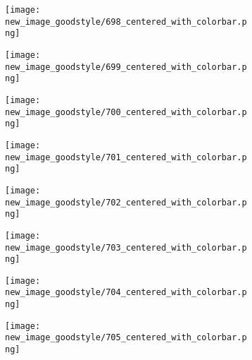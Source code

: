 \documentclass[a4paper,12pt]{article}
\begin{document}
\begin{figure}[H]
  \begin{subfigure}{0.11\textwidth}
    \texttt{[image: new\_image\_goodstyle/698\_centered\_with\_colorbar.png]}
  \end{subfigure}
  \hfill
  \begin{subfigure}{0.11\textwidth}
    \texttt{[image: new\_image\_goodstyle/699\_centered\_with\_colorbar.png]}
  \end{subfigure}
  \hfill
  \begin{subfigure}{0.11\textwidth}
    \texttt{[image: new\_image\_goodstyle/700\_centered\_with\_colorbar.png]}
  \end{subfigure}
  \hfill
  \begin{subfigure}{0.11\textwidth}
    \texttt{[image: new\_image\_goodstyle/701\_centered\_with\_colorbar.png]}
  \end{subfigure}
  \hfill
  \begin{subfigure}{0.11\textwidth}
    \texttt{[image: new\_image\_goodstyle/702\_centered\_with\_colorbar.png]}
  \end{subfigure}
  \hfill
  \begin{subfigure}{0.11\textwidth}
    \texttt{[image: new\_image\_goodstyle/703\_centered\_with\_colorbar.png]}
  \end{subfigure}
  \hfill
  \begin{subfigure}{0.11\textwidth}
    \texttt{[image: new\_image\_goodstyle/704\_centered\_with\_colorbar.png]}
  \end{subfigure}
  \hfill
  \begin{subfigure}{0.11\textwidth}
    \texttt{[image: new\_image\_goodstyle/705\_centered\_with\_colorbar.png]}
  \end{subfigure}
  \hfill
\end{figure}
\end{document}
